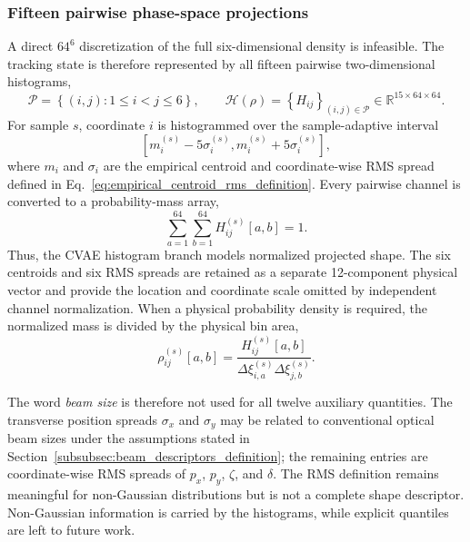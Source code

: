 \subsubsection{Fifteen pairwise phase-space projections}

A direct $64^6$ discretization of the full six-dimensional density is infeasible. The tracking state is therefore represented by all fifteen pairwise two-dimensional histograms,
\begin{equation}
    \mathcal{P}
    =
    \left\{(i,j):1\leq i<j\leq6\right\},
    \qquad
    \mathcal{H}(\rho)
    =
    \left\{H_{ij}\right\}_{(i,j)\in\mathcal{P}}
    \in
    \mathbb{R}^{15\times64\times64}.
    \label{eq:histogram_representation_revised}
\end{equation}
For sample $s$, coordinate $i$ is histogrammed over the sample-adaptive interval
\begin{equation}
    \left[
        m_i^{(s)}-5\sigma_i^{(s)},
        m_i^{(s)}+5\sigma_i^{(s)}
    \right],
    \label{eq:sample_adaptive_histogram_range}
\end{equation}
where $m_i$ and $\sigma_i$ are the empirical centroid and coordinate-wise RMS spread defined in Eq.~\eqref{eq:empirical_centroid_rms_definition}. Every pairwise channel is converted to a probability-mass array,
\begin{equation}
    \sum_{a=1}^{64}
    \sum_{b=1}^{64}
    H_{ij}^{(s)}[a,b]
    =1.
    \label{eq:histogram_mass_normalization}
\end{equation}
Thus, the CVAE histogram branch models normalized projected shape. The six centroids and six RMS spreads are retained as a separate 12-component physical vector and provide the location and coordinate scale omitted by independent channel normalization. When a physical probability density is required, the normalized mass is divided by the physical bin area,
\begin{equation}
    \rho_{ij}^{(s)}[a,b]
    =
    \frac{H_{ij}^{(s)}[a,b]}
    {\Delta\xi_{i,a}^{(s)}\Delta\xi_{j,b}^{(s)}}.
    \label{eq:mass_to_physical_density}
\end{equation}

The word \emph{beam size} is therefore not used for all twelve auxiliary quantities. The transverse position spreads $\sigma_x$ and $\sigma_y$ may be related to conventional optical beam sizes under the assumptions stated in Section~\ref{subsubsec:beam_descriptors_definition}; the remaining entries are coordinate-wise RMS spreads of $p_x$, $p_y$, $\zeta$, and $\delta$. The RMS definition remains meaningful for non-Gaussian distributions but is not a complete shape descriptor. Non-Gaussian information is carried by the histograms, while explicit quantiles are left to future work.

